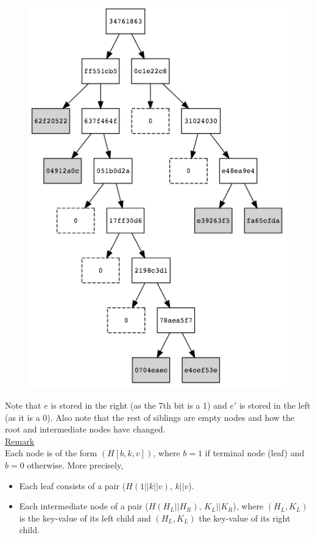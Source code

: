\documentclass[11pt]{article}
\begin{document}
\begin{figure}[h]
	\centering
	\includegraphics[scale=0.5]{images/ex-MT-6.png}
\end{figure}

Note that $e$ is stored in the right (as the 7th bit is a 1) and $e'$ is stored in the left (as it is a 0). Also note that the rest of siblings are empty nodes and how the root and intermediate nodes have changed.\\


{\underline{Remark}}\\

Each node is of the form $(H[b, k, v])$, where $b = 1$ if terminal node (leaf) and $b = 0$ otherwise. More precisely,
\begin{itemize} 
	\item Each leaf consists of a pair ($H(1 || k || v)$, $k||v$).
	\item Each intermediate node of a pair ($H(H_L||H_R)$, $K_L||K_R$), where $(H_L,K_L)$ is the key-value of its left child and $(H_L,K_L)$ the key-value of its right child.
\end{itemize}
%
\end{document}
